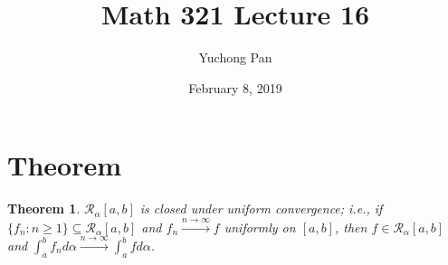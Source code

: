 \documentclass[letterpaper, reqno,11pt]{article}
\begin{document}
\title{Math 321 Lecture 16}
\author{Yuchong Pan}
\date{February 8, 2019}
\newtheorem{thm}{Theorem}
\newtheorem{defn}{Definition}
\newtheorem*{remark}{Remark}
\newtheorem{claim}{Claim}
\newtheorem{cor}{Corollary}
\newtheorem{lemma}{Lemma}
\newtheorem{prop}{Proposition}
\maketitle
%

\section{Theorem}

\begin{thm}
  \normalfont $\mathcal R_\alpha[a, b]$ is closed under uniform convergence; i.e., if $\{ f_n : n \geq 1 \} \subseteq \mathcal R_\alpha[a, b]$ and $f_n \xrightarrow{n \to \infty} f$ uniformly on $[a, b]$, then $f \in \mathcal R_\alpha[a, b]$ and $\int_a^b f_n d\alpha \xrightarrow{n \to \infty} \int_a^b fd\alpha$.
\end{thm}
\end{document}
